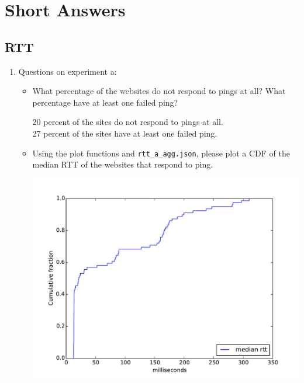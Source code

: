 \documentclass[10pt]{article}
\begin{document}
\section*{Short Answers}

\subsection*{RTT}

\begin{enumerate}
\item Questions on experiment a:

\begin{itemize}
\item What percentage of the websites do not respond to pings at all? What percentage have at least one failed ping?

20 percent of the sites do not respond to pings at all.
\\
27 percent of the sites have at least one failed ping.

\item Using the plot functions and \texttt{rtt\_a\_agg.json}, please plot a CDF of the median RTT of the websites that respond to ping.

\includegraphics[scale=0.5]{plot_median_rtt.pdf}
\\
\\
\\
\\
\\
\\
\\
\\
\\
\\
\\
\\
\\
\\
\\
\\
\\
\\
\\
\end{itemize}


\end{enumerate}
\end{document}
